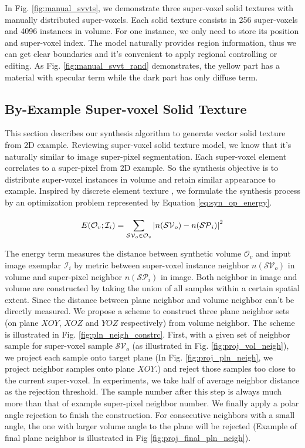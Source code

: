 In Fig. \ref{fig:manual_svvts}, we demonstrate three super-voxel solid textures with manually distributed super-voxels. Each solid texture consists in 256 super-voxels and 4096 instances in volume. For one instance, we only need to store its position and super-voxel index. The model naturally provides region information, thus we can get clear boundaries and it's convenient to apply regional controlling or editing. As Fig. \ref{fig:manual_svvt_rand} demonstrates, the yellow part has a material with specular term while the dark part has only diffuse term.


\subsection{By-Example Super-voxel Solid Texture}
This section describes our synthesis algorithm to generate vector solid texture from 2D example. Reviewing super-voxel solid texture model, we know that it's naturally  similar to image super-pixel segmentation. Each super-voxel element correlates to a super-pixel from 2D example. So the synthesis objective is to distribute super-voxel instances in volume and retain similar appearance to example. Inspired by discrete element texture \cite{ma2011discrete,ma2013dynamic}, we formulate the synthesis process by an optimization problem represented by Equation \ref{eq:syn_op_energy}.

\begin{equation}\label{eq:syn_op_energy}
E(\mathcal{O}_v;\mathcal{I}_i)=\sum_{\mathcal{SV}_o\in\mathcal{O}_v}^{}{\arrowvert n({\mathcal{SV}_o) - n(\mathcal{SP}_i)\arrowvert}^2}
\end{equation}

The energy term measures the distance between synthetic volume $\mathcal{O}_v$ and input image exemplar $\mathcal{I}_i$ by metric between super-voxel instance neighbor $n(\mathcal{SV}_o)$ in volume and super-pixel neighbor $n(\mathcal{SP}_i)$ in image. Both neighbor in image and volume are constructed by taking the union of all samples within a certain spatial extent. Since the distance between plane neighbor and volume neighbor can't be directly measured. We propose a scheme to construct three plane neighbor sets (on plane $XOY$, $XOZ$ and $YOZ$ respectively) from volume neighbor. The scheme is illustrated in Fig. \ref{fig:pln_neigh_constrc}. First, with a given set of neighbor sample for super-voxel sample  $\mathcal{SV}_o$ (as illustrated in Fig. \ref{fig:proj_vol_neigh}), we project each sample onto target plane (In Fig. \ref{fig:proj_pln_neigh}, we project neighbor samples onto plane $XOY$.) and reject those samples too close to the current super-voxel. In experiments, we take half of average neighbor distance as the rejection threshold. The sample number after this step is always much more than that of example super-pixel neighbor number. We finally apply a polar angle rejection to finish the construction. For consecutive neighbors with a small angle, the one with larger volume angle to the plane will be rejected (Example of final plane neighbor is illustrated in Fig \ref{fig:proj_final_pln_neigh}).


